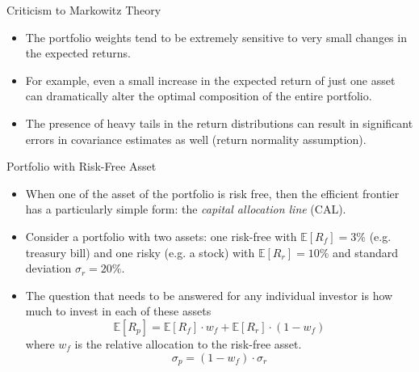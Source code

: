 \documentclass{beamer}
\begin{document}
\begin{frame}{Criticism to Markowitz Theory}
  \begin{itemize}
  \item The portfolio weights tend to be extremely sensitive to very small changes in the expected returns.
  \item For example, even a small increase in the expected return of just one asset can dramatically alter the optimal composition of the entire portfolio.
  \item The presence of heavy tails in the return distributions can result in significant errors in covariance estimates as well (return normality assumption).
  \end{itemize}
\end{frame}

\begin{frame}{Portfolio with Risk-Free Asset}
  \begin{itemize}
  \item When one of the asset of the portfolio is risk free, then the efficient frontier has a particularly simple form: the \emph{capital allocation line} (CAL). 
  \item Consider a portfolio with two assets: one risk-free with $\mathbb{E}[R_f] = 3\%$ (e.g. treasury bill) and one risky (e.g. a stock) with $\mathbb{E}[R_r] = 10\%$ and standard deviation $\sigma_r = 20\%$.
  \item The question that needs to be answered for any individual investor is how much to invest in each of these assets
    \begin{equation*}
      \mathbb{E}[R_p] = \mathbb{E}[R_f]\cdot w_f + \mathbb{E}[R_r] \cdot ( 1 - w_f )
    \end{equation*}
    where $w_f$ is the relative allocation to the risk-free asset.
    \begin{equation*}
      \sigma_p = ( 1 - w_f ) \cdot \sigma_r
    \end{equation*}
  \end{itemize}
\end{frame}
\end{document}
